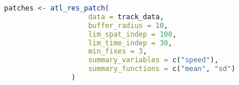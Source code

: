 \begin{refsection}
    \begin{lstlisting}[float, language=R, style=customR, caption ={The \texttt{atl\_res\_patch} function can be used to classify a track into residence patches. The arguments \texttt{buffer\_radius} and \texttt{lim\_spat\_indep} are specified in metres, while the \texttt{lim\_time\_indep} is provided in minutes. In this example, specifying \texttt{summary\_variables = c("speed")}, and \texttt{summary\_functions = c("mean", "sd")} will provide the mean and standard deviation of instantaneous speed in each residence patch. The \texttt{atl\_patch\_summary} function is used to access the classified patch in one of three ways, here using the \texttt{summary} option which returns a table of patch-wise summary statistics.}]
    patches <- atl_res_patch(
                    data = track_data,
                    buffer_radius = 10,
                    lim_spat_indep = 100,
                    lim_time_indep = 30,
                    min_fixes = 3,
                    summary_variables = c("speed"),
                    summary_functions = c("mean", "sd")
                )
    \end{lstlisting}



\end{refsection}

